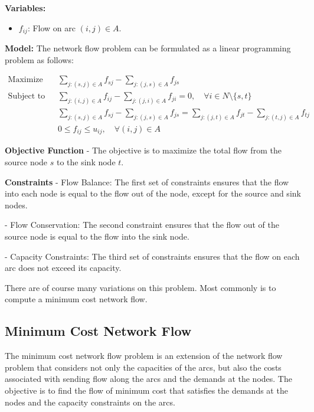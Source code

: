 {\noindent \textbf{Variables:}
\begin{itemize}
\item \( f_{ij} \): Flow on arc \( (i, j) \in A \).
\end{itemize}

\noindent \textbf{Model:}
The network flow problem can be formulated as a linear programming problem as follows:

\begin{align*}
\text{Maximize} \quad & \sum_{j:(s, j) \in A} f_{sj} - \sum_{j:(j, s) \in A} f_{js} \\
\text{Subject to} \quad & \sum_{j:(i, j) \in A} f_{ij} - \sum_{j:(j, i) \in A} f_{ji} = 0, \quad \forall i \in N \setminus \{s, t\} \\
& \sum_{j:(s, j) \in A} f_{sj} - \sum_{j:(j, s) \in A} f_{js} = \sum_{j:(j, t) \in A} f_{jt} - \sum_{j:(t, j) \in A} f_{tj} \\
& 0 \leq f_{ij} \leq u_{ij}, \quad \forall (i, j) \in A
\end{align*}

\noindent \textbf{Objective Function}
- The objective is to maximize the total flow from the source node \( s \) to the sink node \( t \).

\noindent \textbf{Constraints}
- Flow Balance: The first set of constraints ensures that the flow into each node is equal to the flow out of the node, except for the source and sink nodes.

- Flow Conservation: The second constraint ensures that the flow out of the source node is equal to the flow into the sink node.

- Capacity Constraints: The third set of constraints ensures that the flow on each arc does not exceed its capacity.


There are of course many variations on this problem.  Most commonly is to compute a minimum cost network flow.


\subsection{Minimum Cost Network Flow}

The minimum cost network flow problem is an extension of the network flow problem that considers not only the capacities of the arcs, but also the costs associated with sending flow along the arcs and the demands at the nodes. The objective is to find the flow of minimum cost that satisfies the demands at the nodes and the capacity constraints on the arcs.

}
